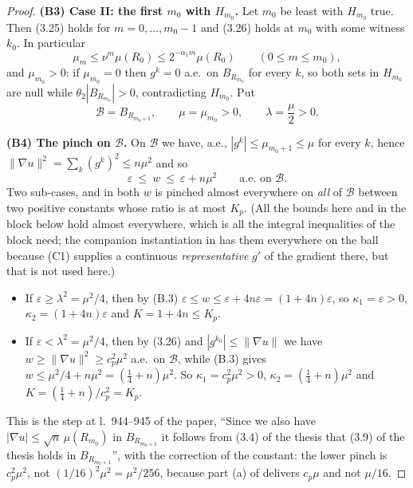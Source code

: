 \begin{proof}
\textbf{(B3) Case II: the first $m_0$ with $H_{m_0}$.}  Let $m_0$ be least with
$H_{m_0}$ true.  Then (3.25) holds for $m=0,\dots,m_0-1$ and (3.26) holds at
$m_0$ with some witness $k_0$.  In particular
\[
\mu_{m}\le\nu^{m}\mu(R_0)\le2^{-\alpha_1m}\mu(R_0)\qquad(0\le m\le m_0),
\tag{B.2}
\]
and $\mu_{m_0}>0$: if $\mu_{m_0}=0$ then $g^k=0$ a.e.\ on $B_{R_{m_0}}$ for
every $k$, so both sets in $H_{m_0}$ are null while
$\theta_2|B_{R_{m_0}}|>0$, contradicting $H_{m_0}$.  Put
\[
\mathcal B=B_{R_{m_0+1}},\qquad \mu=\mu_{m_0}>0,\qquad \lambda=\frac\mu2>0 .
\]

\textbf{(B4) The pinch on $\mathcal B$.}  On $\mathcal B$ we have, a.e.,
$|g^k|\le\mu_{m_0+1}\le\mu$ for every $k$, hence
$\|\nabla u\|^2=\sum_k(g^k)^2\le n\mu^2$ and so
\[
\varepsilon\ \le\ w\ \le\ \varepsilon+n\mu^2
\qquad\text{a.e.\ on }\mathcal B .
\tag{B.3}
\]
Two sub-cases, and in both $w$ is pinched almost everywhere on \emph{all} of
$\mathcal B$ between two positive constants whose ratio is at most $K_p$.  (All
the bounds here and in the block below hold almost everywhere, which is all the
integral inequalities of the block need; the companion instantiation in
 has them everywhere on the ball because (C1)
supplies a continuous \emph{representative} $g'$ of the gradient there, but that
is not used here.)
\begin{itemize}
\item If $\varepsilon\ge\lambda^2=\mu^2/4$, then by (B.3)
  $\varepsilon\le w\le\varepsilon+4n\varepsilon=(1+4n)\varepsilon$, so
  $\kappa_1=\varepsilon>0$, $\kappa_2=(1+4n)\varepsilon$ and $K=1+4n\le K_p$.
\item If $\varepsilon<\lambda^2=\mu^2/4$, then by (3.26) and
  $|g^{k_0}|\le\|\nabla u\|$ we have $w\ge\|\nabla u\|^2\ge c_p^2\mu^2$ a.e.\ on
  $\mathcal B$, while (B.3) gives $w\le\mu^2/4+n\mu^2=(\tfrac14+n)\mu^2$.  So
  $\kappa_1=c_p^2\mu^2>0$, $\kappa_2=(\tfrac14+n)\mu^2$ and
  $K=(\tfrac14+n)/c_p^2=K_p$.
\end{itemize}
This is the step at l.~944--945 of the paper, ``Since we also have
$|\nabla u|\le\sqrt n\,\mu(R_{m_0})$ in $B_{R_{m_0+1}}$ it follows from
(3.4) of the thesis that (3.9) of the thesis holds in $B_{R_{m_0+1}}$'', with the
correction of the constant: the lower pinch is $c_p^2\mu^2$, not
$(1/16)^2\mu^2=\mu^2/256$, because part (a) of
 delivers $c_p\mu$ and not $\mu/16$.


\end{proof}
